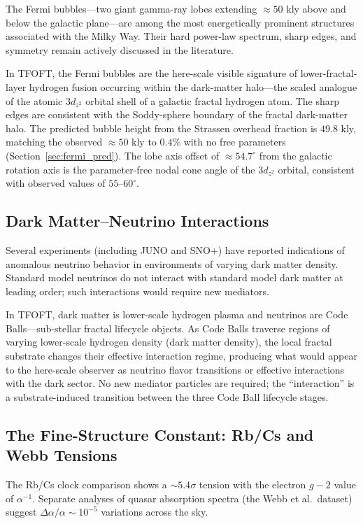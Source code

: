 \documentclass[11pt,a4paper]{article}
\begin{document}
The Fermi bubbles---two giant gamma-ray lobes extending $\approx50$ kly above and below the galactic plane---are among the most energetically prominent structures associated with the Milky Way. Their hard power-law spectrum, sharp edges, and symmetry remain actively discussed in the literature.

In TFOFT, the Fermi bubbles are the here-scale visible signature of lower-fractal-layer hydrogen fusion occurring within the dark-matter halo---the scaled analogue of the atomic $3d_{z^2}$ orbital shell of a galactic fractal hydrogen atom. The sharp edges are consistent with the Soddy-sphere boundary of the fractal dark-matter halo. The predicted bubble height from the Strassen overhead fraction is $49.8$ kly, matching the observed $\approx50$ kly to $0.4\%$ with no free parameters (Section~\ref{sec:fermi_pred}). The lobe axis offset of $\approx54.7^\circ$ from the galactic rotation axis is the parameter-free nodal cone angle of the $3d_{z^2}$ orbital, consistent with observed values of $55$--$60^\circ$.

\subsection{Dark Matter--Neutrino Interactions}

Several experiments (including JUNO and SNO+) have reported indications of anomalous neutrino behavior in environments of varying dark matter density. Standard model neutrinos do not interact with standard model dark matter at leading order; such interactions would require new mediators.

In TFOFT, dark matter is lower-scale hydrogen plasma and neutrinos are Code Balls---sub-stellar fractal lifecycle objects. As Code Balls traverse regions of varying lower-scale hydrogen density (dark matter density), the local fractal substrate changes their effective interaction regime, producing what would appear to the here-scale observer as neutrino flavor transitions or effective interactions with the dark sector. No new mediator particles are required; the ``interaction'' is a substrate-induced transition between the three Code Ball lifecycle stages.

\subsection{The Fine-Structure Constant: Rb/Cs and Webb Tensions}

The Rb/Cs clock comparison shows a $\sim5.4\sigma$ tension with the electron $g-2$ value of $\alpha^{-1}$. Separate analyses of quasar absorption spectra (the Webb et al.\ dataset) suggest $\Delta\alpha/\alpha \sim 10^{-5}$ variations across the sky.
\end{document}
